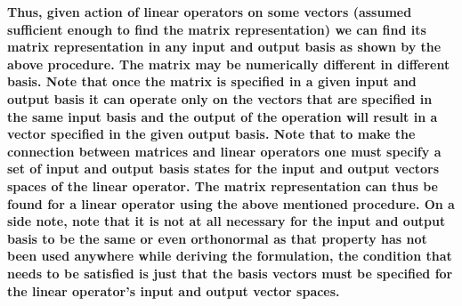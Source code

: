\documentclass[12pt, oneside]{book}
\theoremstyle{definition}
\theoremstyle{definition}
\theoremstyle{remark}
\begin{document}
\textbf{Thus, given action of linear operators on some vectors (assumed sufficient enough to find the matrix representation) we can find its 
matrix representation in any input and output basis as shown by the above procedure. The matrix may be numerically different in different basis. 
Note that once the matrix is specified in a given input and output basis it can operate only on the vectors that are specified in the same input basis and the 
output of the operation will result in a vector specified in the given output basis. Note that to make the connection between matrices and linear operators one must specify
a set of input and output basis states for the input and output vectors spaces of the linear operator. The 
matrix representation can thus be found for a linear operator using the above mentioned procedure. On a side note, note that it is not
at all necessary for the input and output basis to be the same or even orthonormal as that property has not been used anywhere while deriving the formulation, the condition that needs to be satisfied is just that the 
basis vectors must be specified for the linear operator's input and output vector spaces.}\\
\end{document}

